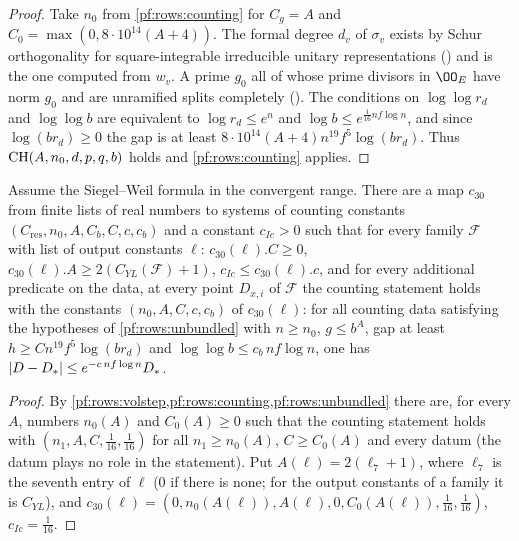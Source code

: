 \begin{proof}
Take $n_0$ from \cref{pf:rows:counting} for $C_g=A$ and $C_0=\max(0,8\cdot10^{14}(A+4))$. The formal degree $d_v$ of
$\sigma_v$ exists by Schur orthogonality for square-integrable irreducible unitary representations
() and is the one computed from $w_v$. A prime $g_0$ all of whose prime
divisors in $\OO_E$ have norm $g_0$ and are unramified splits completely
(). The conditions on $\log\log r_d$ and
$\log\log b$ are equivalent to $\log r_d\le e^n$ and $\log b\le e^{\frac1{16}nf\log n}$, and since $\log(br_d)\ge0$ the
gap is at least $8\cdot10^{14}(A+4)n^{19}f^5\log(br_d)$. Thus $\mathrm{CH}(A,n_0,d,p,q,b)$ holds and
\cref{pf:rows:counting} applies.
\end{proof}

\begin{lemma}\label{pf:rows:countconst}
Assume the Siegel--Weil formula in the convergent range. There are a map $c_{30}$ from finite lists of real numbers to
systems of counting constants $(C_{\mathrm{res}},n_0,A,C_b,C,c,c_b)$ and a constant $c_{Ic}>0$ such that for every family
$\mathcal F$ with list of output constants $\ell$: $c_{30}(\ell).C\ge0$, $c_{30}(\ell).A\ge2(C_{YL}(\mathcal F)+1)$,
$c_{Ic}\le c_{30}(\ell).c$, and for every additional predicate on the data, at every point $D_{x,i}$ of $\mathcal F$ the
counting statement holds with the constants $(n_0,A,C,c,c_b)$ of $c_{30}(\ell)$: for all counting data satisfying the
hypotheses of \cref{pf:rows:unbundled} with $n\ge n_0$, $g\le b^A$, gap at least $h\ge Cn^{19}f^5\log(br_d)$ and
$\log\log b\le c_b\,nf\log n$, one has $|D-D_*|\le e^{-c\,nf\log n}D_*$.
\end{lemma}

\begin{proof}
By \cref{pf:rows:volstep,pf:rows:counting,pf:rows:unbundled} there are, for every $A$, numbers $n_0(A)$ and $C_0(A)\ge0$
such that the counting statement holds with $(n_1,A,C,\frac1{16},\frac1{16})$ for all $n_1\ge n_0(A)$, $C\ge C_0(A)$ and
every datum (the datum plays no role in the statement). Put $A(\ell)=2(\ell_7+1)$, where $\ell_7$ is the seventh entry of
$\ell$ ($0$ if there is none; for the output constants of a family it is $C_{YL}$), and
$c_{30}(\ell)=(0,n_0(A(\ell)),A(\ell),0,C_0(A(\ell)),\frac1{16},\frac1{16})$, $c_{Ic}=\frac1{16}$.
\end{proof}

